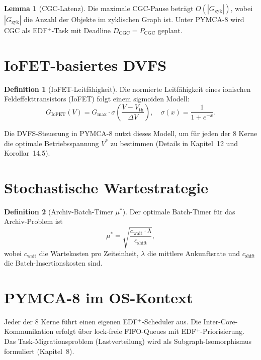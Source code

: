﻿\documentclass[a4paper,12pt]{scrreprt}
\theoremstyle{definition}
\newtheorem{definition}{Definition}[chapter]
\newtheorem{lemma}{Lemma}[chapter]
\begin{document}
	\begin{lemma}[CGC-Latenz]\label{lem:cgc}
		Die maximale CGC-Pause beträgt $O(|G_{\mathrm{zyk}}|)$, wobei
		$|G_{\mathrm{zyk}}|$ die Anzahl der Objekte im zyklischen Graph ist.
		Unter PYMCA-8 wird CGC als EDF$^+$-Task mit Deadline
		$D_{\mathrm{CGC}} = P_{\mathrm{CGC}}$ geplant.
	\end{lemma}
	
	\section{IoFET-basiertes DVFS}
	
	\begin{definition}[IoFET-Leitfähigkeit]
		Die normierte Leitfähigkeit eines ionischen Feldeffekttransistors
		(IoFET) \cite{Epp2026iono} folgt einem sigmoiden Modell:
		\[
		G_{\mathrm{IoFET}}(V) = G_{\max} \cdot \sigma\!\left(\frac{V - V_{\mathrm{th}}}{\Delta V}\right),
		\quad
		\sigma(x) = \frac{1}{1 + e^{-x}}.
		\]
	\end{definition}
	
	Die DVFS-Steuerung in PYMCA-8 nutzt dieses Modell, um für jeden der
	8 Kerne die optimale Betriebsspannung $V^*$ zu bestimmen (Details in
	Kapitel~12 und Korollar~14.5).
	
	\section{Stochastische Wartestrategie}
	
	\begin{definition}[Archiv-Batch-Timer $\mu^*$]
		Der optimale Batch-Timer für das Archiv-Problem \cite{Epp2026archv} ist
		\[
		\mu^* = \sqrt{\frac{c_{\mathrm{wait}} \cdot \lambda}{c_{\mathrm{shift}}}},
		\]
		wobei $c_{\mathrm{wait}}$ die Wartekosten pro Zeiteinheit,
		$\lambda$ die mittlere Ankunftsrate und $c_{\mathrm{shift}}$
		die Batch-Insertionskosten sind.
	\end{definition}
	
	\section{PYMCA-8 im OS-Kontext}
	
	Jeder der 8 Kerne führt einen eigenen EDF$^+$-Scheduler aus. Die
	Inter-Core-Kommunikation erfolgt über lock-freie FIFO-Queues mit
	EDF$^+$-Priorisierung. Das Task-Migrationsproblem (Lastverteilung)
	wird als Subgraph-Isomorphismus formuliert (Kapitel~8).
	
\end{document}

